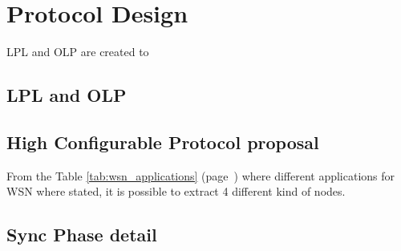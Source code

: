 \chapter{Protocol Design}
\label{chap:protocoldesign}

LPL and OLP are created to 
\section{\ac{LPL} and \ac{OLP}}

\section{High Configurable Protocol proposal}

From the Table \ref{tab:wsn_applications} (page~\pageref{tab:wsn_applications}) where different applications for \ac{WSN} where stated, it is possible
to extract 4 different kind of nodes.

\section{Sync Phase detail}
